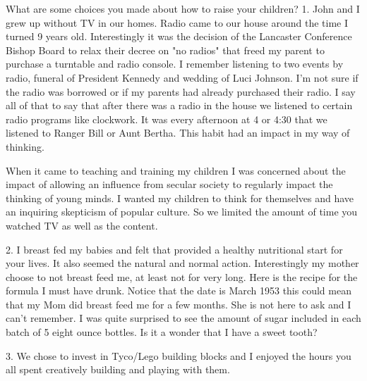 What are some choices you made about how to raise your children?
    1. John and I grew up without TV in our homes. Radio came to our house around the time I turned 9 years old. Interestingly it was the decision of the Lancaster Conference Bishop Board to relax their decree on "no radios" that freed my parent to purchase a turntable and radio console. I remember listening to two events by radio, funeral of President Kennedy and wedding of Luci Johnson.  I'm not sure if the radio was borrowed or if my parents had already purchased their radio. I say all of that to say that after there was a radio in the house we listened to certain radio programs like clockwork. It was every afternoon at 4 or 4:30 that we listened to Ranger Bill or Aunt Bertha. This habit had an impact in my way of thinking. 

When it came to teaching and training my children I was concerned about the impact of     allowing an influence from secular society to regularly impact the thinking of young minds. I wanted my children to think for themselves and have an inquiring skepticism of popular culture. So we limited the amount of time you watched TV as well as the content.

    2. I breast fed my babies and felt that provided a healthy nutritional start for your lives. It also seemed the natural and normal action. Interestingly my mother choose to not breast feed me, at least not for very long. Here is the recipe for the formula I must have drunk. Notice that the date is March 1953 this could mean that my Mom did breast feed me for a few months. She is not here to ask and I can't remember. I was quite surprised to see the amount of sugar included in each batch of 5 eight ounce bottles. Is it a wonder that I have a sweet tooth?

    3. We chose to invest in Tyco/Lego building blocks and I enjoyed the hours you all spent creatively building and playing with them.





